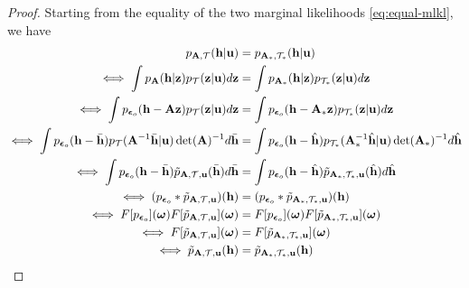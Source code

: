 \documentclass{article} %
\theoremstyle{plain}
\theoremstyle{definition}
\theoremstyle{remark}
\begin{document}
\begin{proof}
    Starting from the equality of the two marginal likelihoods \eqref{eq:equal-mlkl}, we have
    \begin{align}
        p_{\mathbf{A},\mathcal{T}}(\mathbf{h}|\mathbf{u})&=p_{\mathbf{A}_{*},\mathcal{T}_*}(\mathbf{h}|\mathbf{u})\\   
        \iff \int p_{\mathbf{A}}(\mathbf{h}|\mathbf{z})p_{\mathcal{T}}(\mathbf{z}|\mathbf{u})d\mathbf{z} &= \int p_{\mathbf{A}_{*}}(\mathbf{h}|\mathbf{z})p_{\mathcal{T}_{*}}(\mathbf{z}|\mathbf{u})d\mathbf{z}\\
        \iff \int p_{\boldsymbol{\epsilon}_o}(\mathbf{h}-\mathbf{A}\mathbf{z})p_{\mathcal{T}}(\mathbf{z}|\mathbf{u})d\mathbf{z} &= \int p_{\boldsymbol{\epsilon}_o}(\mathbf{h}-\mathbf{A}_{*}\mathbf{z})p_{\mathcal{T}_{*}}(\mathbf{z}|\mathbf{u})d\mathbf{z}\\
        \iff \int p_{\boldsymbol{\epsilon}_o}(\mathbf{h}-\Bar{\mathbf{h}})p_{\mathcal{T}}(\mathbf{A}^{-1}\Bar{\mathbf{h}}|\mathbf{u})\det(\mathbf{A})^{-1}d\Bar{\mathbf{h}} &= \int p_{\boldsymbol{\epsilon}_o}(\mathbf{h}-\Hat{\mathbf{h}})p_{\mathcal{T}_{*}}(\mathbf{A}_{*}^{-1}\Hat{\mathbf{h}}|\mathbf{u})\det(\mathbf{A}_{*})^{-1}d\Hat{\mathbf{h}}\label{eq:reduce-1}\\
        \iff \int p_{\boldsymbol{\epsilon}_o}(\mathbf{h}-\Bar{\mathbf{h}})\Tilde{p}_{\mathbf{A},\mathcal{T},\mathbf{u}}(\Bar{\mathbf{h}})d\Bar{\mathbf{h}} &= \int p_{\boldsymbol{\epsilon}_o}(\mathbf{h}-\Hat{\mathbf{h}})\Tilde{p}_{\mathbf{A}_{*},\mathcal{T}_{*},\mathbf{u}}(\Hat{\mathbf{h}})d\Hat{\mathbf{h}}\label{eq:reduce-2}\\
        \iff (p_{\boldsymbol{\epsilon}_o}*\Tilde{p}_{\mathbf{A},\mathcal{T},\mathbf{u}})(\mathbf{h})&=(p_{\boldsymbol{\epsilon}_o}*\Tilde{p}_{\mathbf{A}_{*},\mathcal{T}_{*},\mathbf{u}})(\mathbf{h})\label{eq:reduce-3}\\
        \iff F[p_{\boldsymbol{\epsilon}_o}](\boldsymbol{\omega})F[\Tilde{p}_{\mathbf{A},\mathcal{T},\mathbf{u}}](\boldsymbol{\omega})&=F[p_{\boldsymbol{\epsilon}_o}](\boldsymbol{\omega})F[\Tilde{p}_{\mathbf{A}_{*},\mathcal{T}_{*},\mathbf{u}}](\boldsymbol{\omega})\label{eq:reduce-4}\\
        \iff F[\Tilde{p}_{\mathbf{A},\mathcal{T},\mathbf{u}}](\boldsymbol{\omega})&=F[\Tilde{p}_{\mathbf{A}_{*},\mathcal{T}_{*},\mathbf{u}}](\boldsymbol{\omega})\label{eq:reduce-5}\\
        \iff \Tilde{p}_{\mathbf{A},\mathcal{T},\mathbf{u}}(\mathbf{h}) &= \Tilde{p}_{\mathbf{A}_{*},\mathcal{T}_{*},\mathbf{u}}(\mathbf{h})\\

\end{align}
\end{proof}
\end{document}

